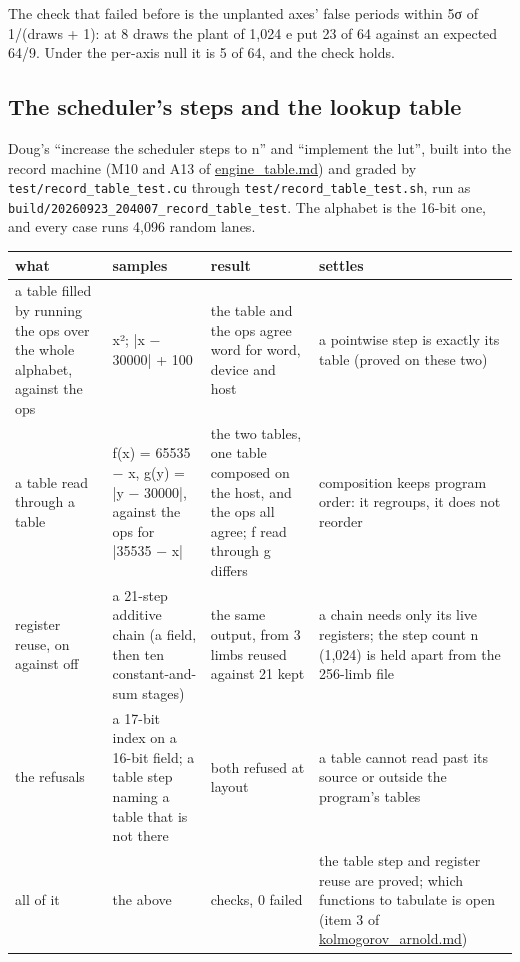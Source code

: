 The check that failed before is the unplanted axes' false periods within 5σ of 1/(draws + 1): at 8 draws the plant of 1,024 e put 23 of 64 against an expected 64/9. Under the per-axis null it is 5 of 64, and the check holds.

\subsection{\texorpdfstring{The scheduler's steps and the lookup table}{The scheduler's steps and the lookup table}}

Doug's “increase the scheduler steps to n” and “implement the lut”, built into the record machine (M10 and A13 of \hyperref[chap:engine-table]{engine\_\allowbreak{}table.md}) and graded by \texttt{test/\allowbreak{}record\_\allowbreak{}table\_\allowbreak{}test.\allowbreak{}cu} through \texttt{test/\allowbreak{}record\_\allowbreak{}table\_\allowbreak{}test.\allowbreak{}sh}, run as \texttt{build/\allowbreak{}20260923\_\allowbreak{}204007\_\allowbreak{}record\_\allowbreak{}table\_\allowbreak{}test}. The alphabet is the 16-bit one, and every case runs 4,096 random lanes.

{\footnotesize
\setlength{\tabcolsep}{6pt}
\begin{longtable}{>{\RaggedRight\arraybackslash}p{}>{\RaggedRight\arraybackslash}p{}>{\RaggedRight\arraybackslash}p{}>{\RaggedRight\arraybackslash}p{}}
\toprule
what & samples & result & settles \\
\midrule
\endhead
a table filled by running the ops over the whole alphabet, against the ops & x²; |x − 30000| + 100 & the table and the ops agree word for word, device and host & a pointwise step is exactly its table (proved on these two) \\
a table read through a table & f(x) = 65535 − x, g(y) = |y − 30000|, against the ops for |35535 − x| & the two tables, one table composed on the host, and the ops all agree; f read through g differs & composition keeps program order: it regroups, it does not reorder \\
register reuse, on against off & a 21-step additive chain (a field, then ten constant-and-sum stages) & the same output, from 3 limbs reused against 21 kept & a chain needs only its live registers; the step count n (1,024) is held apart from the 256-limb file \\
the refusals & a 17-bit index on a 16-bit field; a table step naming a table that is not there & both refused at layout & a table cannot read past its source or outside the program's tables \\
all of it & the above & 15 checks, 0 failed & the table step and register reuse are proved; which functions to tabulate is open (item 3 of \hyperref[chap:kolmogorov-arnold]{kolmogorov\_\allowbreak{}arnold.md}) \\
\bottomrule
\end{longtable}
}


